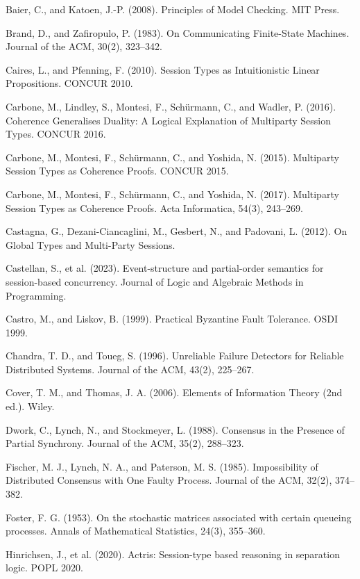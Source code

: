 \documentclass[a4paper,10pt,twocolumn,english]{article}
\numberwithin{equation}{section}
\theoremstyle{paperdef}
\theoremstyle{paperplain}
\theoremstyle{paperdef}
\theoremstyle{paperremark}
\newenvironment{citelist}{%
  \begin{list}{}{%
    \setlength{\leftmargin}{1.25em}%
    \setlength{\itemindent}{-1.25em}%
    \setlength{\itemsep}{2pt}%
    \setlength{\parsep}{0pt}%
    \setlength{\topsep}{3pt}}%
}{\end{list}}
\begin{document}
\begin{citelist}
	\item Baier, C., and Katoen, J.-P. (2008). Principles of Model Checking. MIT Press.
	\item Brand, D., and Zafiropulo, P. (1983). On Communicating Finite-State Machines. Journal of the ACM, 30(2), 323--342.
	\item Caires, L., and Pfenning, F. (2010). Session Types as Intuitionistic Linear Propositions. CONCUR 2010.
	\item Carbone, M., Lindley, S., Montesi, F., Sch\"urmann, C., and Wadler, P. (2016). Coherence Generalises Duality: A Logical Explanation of Multiparty Session Types. CONCUR 2016.
	\item Carbone, M., Montesi, F., Sch\"urmann, C., and Yoshida, N. (2015). Multiparty Session Types as Coherence Proofs. CONCUR 2015.
	\item Carbone, M., Montesi, F., Sch\"urmann, C., and Yoshida, N. (2017). Multiparty Session Types as Coherence Proofs. Acta Informatica, 54(3), 243--269.
	\item Castagna, G., Dezani-Ciancaglini, M., Gesbert, N., and Padovani, L. (2012). On Global Types and Multi-Party Sessions.
	\item Castellan, S., et al. (2023). Event-structure and partial-order semantics for session-based concurrency. Journal of Logic and Algebraic Methods in Programming.
	\item Castro, M., and Liskov, B. (1999). Practical Byzantine Fault Tolerance. OSDI 1999.
	\item Chandra, T. D., and Toueg, S. (1996). Unreliable Failure Detectors for Reliable Distributed Systems. Journal of the ACM, 43(2), 225--267.
	\item Cover, T. M., and Thomas, J. A. (2006). Elements of Information Theory (2nd ed.). Wiley.
	\item Dwork, C., Lynch, N., and Stockmeyer, L. (1988). Consensus in the Presence of Partial Synchrony. Journal of the ACM, 35(2), 288--323.
	\item Fischer, M. J., Lynch, N. A., and Paterson, M. S. (1985). Impossibility of Distributed Consensus with One Faulty Process. Journal of the ACM, 32(2), 374--382.
	\item Foster, F. G. (1953). On the stochastic matrices associated with certain queueing processes. Annals of Mathematical Statistics, 24(3), 355--360.
	\item Hinrichsen, J., et al. (2020). Actris: Session-type based reasoning in separation logic. POPL 2020.

\end{citelist}
\end{document}
